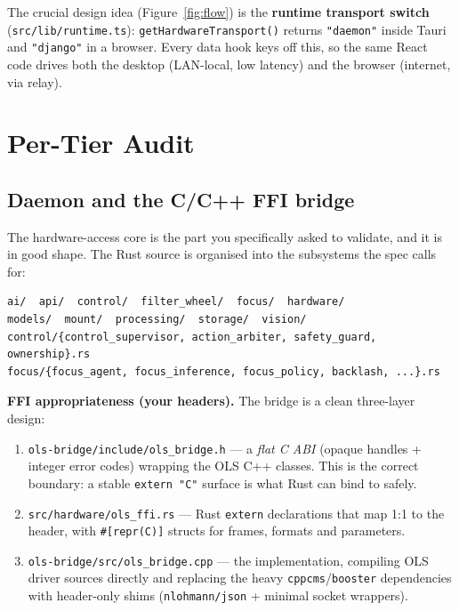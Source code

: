 \documentclass[11pt]{article}
\newcommand{\fn}[1]{\texttt{#1}}
\begin{document}
\noindent The crucial design idea (Figure~\ref{fig:flow}) is the \textbf{runtime transport switch}
(\fn{src/lib/runtime.ts}): \texttt{getHardwareTransport()} returns \texttt{"daemon"} inside Tauri and
\texttt{"django"} in a browser. Every data hook keys off this, so the same React code drives both the
desktop (LAN-local, low latency) and the browser (internet, via relay).

\section{Per-Tier Audit}

\subsection{Daemon and the C/C++ FFI bridge}

The hardware-access core is the part you specifically asked to validate, and it is in good shape.
The Rust source is organised into the subsystems the spec calls for:

\begin{lstlisting}
ai/  api/  control/  filter_wheel/  focus/  hardware/
models/  mount/  processing/  storage/  vision/
control/{control_supervisor, action_arbiter, safety_guard, ownership}.rs
focus/{focus_agent, focus_inference, focus_policy, backlash, ...}.rs
\end{lstlisting}

\noindent\textbf{FFI appropriateness (your headers).} The bridge is a clean three-layer design:

\begin{enumerate}[leftmargin=1.4em]
  \item \fn{ols-bridge/include/ols\_bridge.h} --- a \emph{flat C ABI} (opaque handles +
  integer error codes) wrapping the OLS C++ classes. This is the correct boundary: a stable
  \texttt{extern "C"} surface is what Rust can bind to safely.
  \item \fn{src/hardware/ols\_ffi.rs} --- Rust \texttt{extern} declarations that map 1:1 to the header,
  with \texttt{\#[repr(C)]} structs for frames, formats and parameters.
  \item \fn{ols-bridge/src/ols\_bridge.cpp} --- the implementation, compiling OLS driver sources directly
  and replacing the heavy \texttt{cppcms}/\texttt{booster} dependencies with header-only shims
  (\texttt{nlohmann/json} + minimal socket wrappers).
\end{enumerate}
\end{document}
